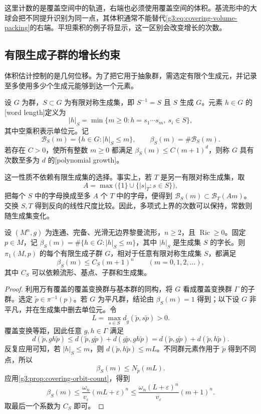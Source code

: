 这里计数的是覆盖空间中的轨道，右端也必须使用覆盖空间的体积。基流形中的大球会把不同提升识别为同一点，其体积通常不能替代\eqref{g3:eq:covering-volume-packing}的右端。平坦乘积的例子将显示，这一区别会改变增长的次数。

\subsection{有限生成子群的增长约束}
\label{g3:subsec:0803:03}

体积估计控制的是几何位移。为了把它用于抽象群，需选定有限个生成元，并记录至多使用多少个生成元能够到达一个元素。

\begin{definition}\label{g3:def:word-growth}
	设 \(G\) 为群，\(S\subset G\) 为有限对称生成集，即 \(S^{-1}=S\) 且 \(S\) 生成 \(G\)。元素 \(h\in G\) 的[word length]定义为
	\[
		|h|_S=\min\{m\ge0:h=s_1\cdots s_m,\ s_i\in S\},
	\]
	其中空乘积表示单位元。记
	\[
		\mathcal B_S(m)=\{h\in G:|h|_S\le m\},
		\qquad \beta_S(m)=\#\mathcal B_S(m).
	\]
	若存在 \(C>0\)，使所有整数 \(m\ge0\) 都满足
	\(\beta_S(m)\le C(m+1)^d\)，则称 \(G\) 具有次数至多为 \(d\) 的[polynomial growth]。
\end{definition}

这一性质不依赖有限生成集的选择。事实上，若 \(T\) 是另一有限对称生成集，取
\[
	A=\max\bigl(\{1\}\cup\{|s|_T:s\in S\}\bigr),
\]
把每个 \(S\) 中的字母换成至多 \(A\) 个 \(T\) 中的字母，便得到
\(\mathcal B_S(m)\subset\mathcal B_T(Am)\)。交换 \(S,T\) 得到反向的线性尺度比较。因此，多项式上界的次数可以保持，常数则随生成集变化。

\begin{theorem}\label{g3:thm:fundamental-subgroup-growth}
	设 \((M^n,g)\) 为连通、完备、光滑无边界黎曼流形，\(n\ge2\)，且 \(\operatorname{Ric}\ge0\)。固定 \(p\in M\)，记 \(\beta_S(m)=\#\{h\in G:|h|_S\le m\}\)，其中 \(|h|_S\) 是生成集 \(S\) 的字长。则 \(\pi_1(M,p)\) 的每个有限生成子群 \(G\)，相对于任意有限对称生成集 \(S\)，都满足
	\[
		\beta_S(m)\le C_S(m+1)^n
		\qquad(m=0,1,2,\ldots),
	\]
	其中 \(C_S\) 可以依赖流形、基点、子群和生成集。
\end{theorem}
\begin{proof}
	利用万有覆盖的覆盖变换群与基本群的同构，将 \(G\) 看成覆盖变换群 \(\Gamma\) 的子群。选定 \(\widetilde p\in\pi^{-1}(p)\)。若 \(G\) 为平凡群，结论由 \(\beta_S(m)=1\) 得到；以下设 \(G\) 非平凡，并在生成集中删去单位元。令
	\[
		L=\max_{s\in S}d_{\widetilde g}(\widetilde p,s\widetilde p)>0.
	\]
	覆盖变换等距，因此任意 \(g,h\in\Gamma\) 满足
	\[
		d(\widetilde p,gh\widetilde p)
		\le d(\widetilde p,g\widetilde p)
		+d(g\widetilde p,gh\widetilde p)
		=d(\widetilde p,g\widetilde p)
		+d(\widetilde p,h\widetilde p).
	\]
	反复应用可知，若 \(|h|_S\le m\)，则
	\(d(\widetilde p,h\widetilde p)\le mL\)。不同群元素作用于 \(\widetilde p\) 得到不同点，所以
	\[
		\beta_S(m)\le N_{\widetilde p}(mL).
	\]
	应用\cref{g3:prop:covering-orbit-count}，得到
	\[
		\beta_S(m)
		\le\frac{\omega_n}{v_\varepsilon}(mL+\varepsilon)^n
		\le\frac{\omega_n(L+\varepsilon)^n}{v_\varepsilon}(m+1)^n.
	\]
	取最后一个系数为 \(C_S\) 即可。
\end{proof}

